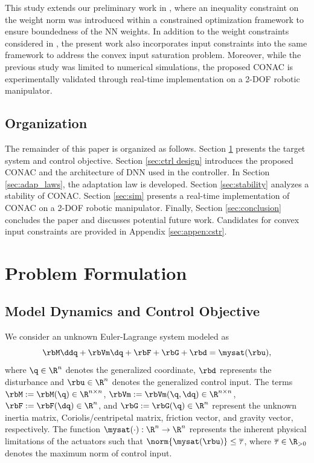 \documentclass[letterpaper, journal]{IEEEtran}
\begin{document}
\hfill

This study extends our preliminary work in \cite{Ryu:2024aa}, where an inequality constraint on the weight norm was introduced within a constrained optimization framework to ensure boundedness of the NN weights. 
In addition to the weight constraints considered in \cite{Ryu:2024aa}, the present work also incorporates input constraints into the same framework to address the convex input saturation problem. 
Moreover, while the previous study was limited to numerical simulations, the proposed CONAC is experimentally validated through real-time implementation on a 2-DOF robotic manipulator.

\subsection{Organization}

The remainder of this paper is organized as follows. 
Section \ref{sec:Problem Formulation} presents the target system and control objective.
Section \ref{sec:ctrl design} introduces the proposed CONAC and the architecture of DNN used in the controller. 
In Section \ref{sec:adap_laws}, the adaptation law is developed.
Section \ref{sec:stability} analyzes a stability of CONAC.
Section \ref{sec:sim} presents a real-time implementation of CONAC on a 2-DOF robotic manipulator.
Finally, Section \ref{sec:conclusion} concludes the paper and discusses potential future work.
Candidates for convex input constraints are provided in Appendix \ref{sec:appen:cstr}. 

\section{Problem Formulation}\label{sec:Problem Formulation}

\subsection{Model Dynamics and Control Objective}

We consider an unknown Euler-Lagrange system modeled as
\begin{equation}
    \rbM\ddq +\rbVm \dq+ \rbF + \rbG + \rbd
    =
    \mysat(\rbu)
    ,
    \label{eq:sys1}
\end{equation}
where $\q\in \R^n$ denotes the generalized coordinate, $\rbd$ represents the disturbance and $\rbu\in\R^n$ denotes the generalized control input. 
The terms $\rbM:=\rbM(\q)\in\R^{n\times n}$, $\rbVm:=\rbVm(\q,\dq)\in\R^{n\times n}$, $\rbF:=\rbF(\dq)\in\R^{n}$, and $\rbG:=\rbG(\q)\in\R^{n}$ represent the unknown inertia matrix, Coriolis/centripetal matrix, friction vector, and gravity vector, respectively.
The function $\mysat(\cdot):\R^n\to\R^n$ represents the inherent physical limitations of the actuators such that $\norm{\mysat(\rbu)}\le \overline\tau$, where $\overline\tau\in\R_{>0}$ denotes the maximum norm of control input.
\end{document}
